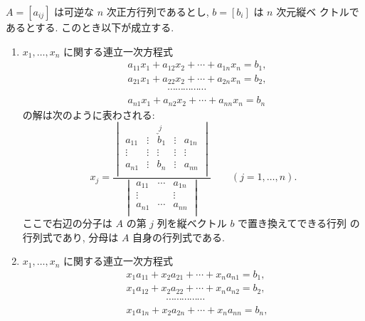 \documentclass[12pt,twoside]{jarticle}
\begin{document}

\begin{question}
  \label{q:Cramer}
  $A=[a_{ij}]$ は可逆な $n$ 次正方行列であるとし, $b=[b_i]$ は $n$ 次元縦ベ
  クトルであるとする. このとき以下が成立する.
  \begin{enumerate}
  \item $x_1,\ldots,x_n$ に関する連立一次方程式
    \begin{align*}
      &
      a_{11}x_1 + a_{12}x_2 + \cdots + a_{1n}x_n = b_1,
      \\ &
      a_{21}x_1 + a_{22}x_2 + \cdots + a_{2n}x_n = b_2,
      \\ &
      \qquad\qquad \cdots\cdots\cdots\cdots\cdots
      \\ &
      a_{n1}x_1 + a_{n2}x_2 + \cdots + a_{nn}x_n = b_n
    \end{align*}
    の解は次のように表わされる:
    \begin{equation*}
      x_j = 
      \frac{
        \begin{vmatrix}
          a_{11} & \vdots & \overset{\;j}{\check{b}}_1 & \vdots & a_{1n} \\
          \vdots & \vdots & \vdots & \vdots & \vdots \\
          a_{n1} & \vdots & b_n    & \vdots & a_{nn} \\
        \end{vmatrix}
        }{
        \begin{vmatrix}
          a_{11} & \cdots & a_{1n} \\
          \vdots &        & \vdots \\
          a_{n1} & \cdots & a_{nn} \\
        \end{vmatrix}
        }
      \qquad (j=1,\ldots,n).
    \end{equation*}
    ここで右辺の分子は $A$ の第 $j$ 列を縦ベクトル $b$ で置き換えてできる行列
    の行列式であり, 分母は $A$ 自身の行列式である.
  \item $x_1,\ldots,x_n$ に関する連立一次方程式
    \begin{align*}
      &
      x_1 a_{11} + x_2 a_{21} + \cdots + x_n a_{n1} = b_1,
      \\ &
      x_1 a_{12} + x_2 a_{22} + \cdots + x_n a_{n2} = b_2,
      \\ &
      \qquad\qquad \cdots\cdots\cdots\cdots\cdots
      \\ &
      x_1 a_{1n} + x_2 a_{2n} + \cdots + x_n a_{nn} = b_n,

\end{align*}
\end{enumerate}
\end{question}
\end{document}
